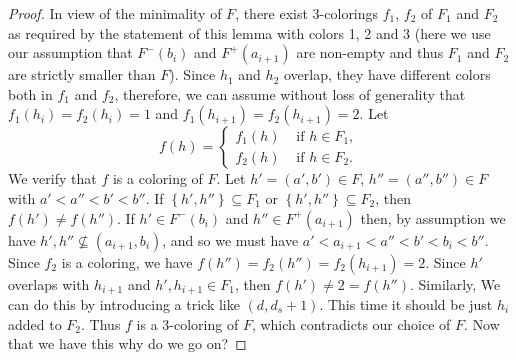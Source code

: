 \documentclass[12pt]{article}
\theoremstyle{definition}
\begin{document}
\begin{proof}
        In view of the minimality of
        $F$, there exist 3-colorings
        $f_1$, $f_2$ of $F_1$ and $F_2$ as required
        by the statement of this lemma
        with colors 1, 2 and 3 (here
        we use our assumption that
        $F^{-}\left(b_{i}\right)$ 
        and $F^{+}\left(a_{i+1}\right)$ 
        are non-empty and thus
        $F_{1}$ and $F_{2}$ are
        strictly smaller than $F$).
        Since $h_1$ and $h_2$ overlap,
        they have different colors
        both in $f_1$ and $f_2$, therefore,
        we can assume without loss of 
        generality that
        $f_1\left(h_{i}\right) = f_2\left(h_{i}\right) = 1$
        and $f_{1}\left(h_{i+1}\right) = 
        f_2\left(h_{i+1}\right) = 2$.
        Let
        \begin{equation*}
            f\left(h\right) = 
            \begin{cases}
                f_1\left(h\right) &\text{ if } h \in F_1, \\
                f_2\left(h\right) &\text{ if } h \in F_{2}.
            \end{cases}
        \end{equation*}
        We verify that $f$ 
        is a coloring of $F$. Let
        $h' = \left(a', b'\right) \in F$,
        $h'' = \left(a'', b''\right) \in F$
        with $a' < a'' < b' < b''$.
        If $\left\{h', h''\right\} \subseteq F_1$ 
        or $\left\{h', h''\right\} \subseteq F_2$,
        then $f\left(h'\right) \neq 
        f\left(h''\right)$.
        If $h' \in F^{-}\left(b_{i}\right)$ 
        and $h'' \in F^{+}\left(a_{i+1}\right)$
        then, by assumption
        we have
        $h', h'' \not \subseteq \left(a_{i+1}, b_{i}\right)$,
        and so we must have $a' < a_{i+1} < 
        a'' < b' < b_{i} < b''$. 
        Since $f_2$ is a coloring,
        we have $f\left(h''\right) =
        f_2\left(h''\right) =
        f_2\left(h_{i+1}\right) = 2$.
        Since $h'$ overlaps with $h_{i+1}$
        and $h', h_{i+1}
        \in F_1$, then $f\left(h'\right)
        \neq 2 = f\left(h''\right)$.
        Similarly, 
        {We can do this by introducing 
        a trick like $\left(d, d_{s} + 1\right)$.
        This time it should be just
        $h_{i}$ added
        to $F_2$.}
        Thus
        $f$ is a 3-coloring of $F$,
        which contradicts our choice of $F$.
        {Now that we have this
        why do we go on?}


\end{proof}
\end{document}
